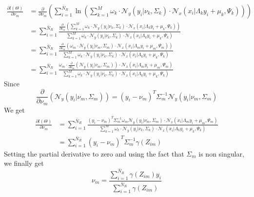 \begin{align}
\frac{\partial l(\Theta)   }{\partial  \nu_m } &=\frac{\partial }{\partial \nu_m}\left( \sum\limits_{i = 1}^{\bar{N}_R}\ln\left(\sum\limits_{k = 1}^{M}\omega_k\cdot
\mathcal{N}_y\left(y_i\vert\nu_k,\Sigma_k\right)\cdot\mathcal{N}_x\left(x_i\vert\Lambda_ky_i + \mu_k,\Psi_k\right)\right)\right)\\
&= \sum\limits_{i = 1}^{\bar{N}_R}
\frac{\frac{\partial }{\partial \nu_m}\left(\sum\limits_{k = 1}^{M}\omega_k\cdot
\mathcal{N}_y\left(y_i\vert\nu_k,\Sigma_k\right)\cdot\mathcal{N}_x\left(x_i\vert\Lambda_ky_i + \mu_k,\Psi_k\right)\right)}{\sum\limits_{k = 1}^{M}\omega_k\cdot
\mathcal{N}_y\left(y_i\vert\nu_k,\Sigma_k\right)\cdot\mathcal{N}_x\left(x_i\vert\Lambda_ky_i + \mu_k,\Psi_k\right) }\\
&= \sum\limits_{i = 1}^{\bar{N}_R}
\frac{\frac{\partial }{\partial \nu_m}\left(\omega_m\cdot
\mathcal{N}_y\left(y_i\vert\nu_m,\Sigma_m\right)\cdot\mathcal{N}_x\left(x_i\vert\Lambda_my_i + \mu_m,\Psi_m\right)\right)}{\sum\limits_{k = 1}^{M}\omega_k\cdot
\mathcal{N}_y\left(y_i\vert\nu_k,\Sigma_k\right)\cdot\mathcal{N}_x\left(x_i\vert\Lambda_ky_i + \mu_k,\Psi_k\right) }\\
&= \sum\limits_{i = 1}^{\bar{N}_R}
\frac{\omega_m\cdot
\frac{\partial }{\partial \nu_m}\left(\mathcal{N}_y\left(y_i\vert\nu_m,\Sigma_m\right)\right)\cdot\mathcal{N}_x\left(x_i\vert\Lambda_my_i + \mu_m,\Psi_m\right)}{\sum\limits_{k = 1}^{M}\omega_k\cdot
\mathcal{N}_y\left(y_i\vert\nu_k,\Sigma_k\right)\cdot\mathcal{N}_x\left(x_i\vert\Lambda_ky_i + \mu_k,\Psi_k\right) }
\end{align}
Since
\begin{equation}
\frac{\partial }{\partial \nu_m}\left(\mathcal{N}_y\left(y_i\vert\nu_m,\Sigma_m\right)\right) = \left(y_i - \nu_m\right)^T\Sigma_m^{-1}\mathcal{N}_y\left(y_i\vert\nu_m,\Sigma_m\right)
\end{equation}
We get
\begin{align}
\frac{\partial l(\Theta)   }{\partial  \nu_m } & = \sum\limits_{i = 1}^{\bar{N}_R}
\frac{\left(y_i - \nu_m\right)^T\Sigma_m^{-1}
\omega_m \mathcal{N}_y\left(y_i\vert\nu_m,\Sigma_m\right)\cdot\mathcal{N}_x\left(x_i\vert\Lambda_my_i + \mu_m,\Psi_m\right)}{\sum\limits_{k = 1}^{M}\omega_k\cdot
\mathcal{N}_y\left(y_i\vert\nu_k,\Sigma_k\right)\cdot\mathcal{N}_x\left(x_i\vert\Lambda_ky_i + \mu_k,\Psi_k\right) }\\
&= \sum\limits_{i = 1}^{\bar{N}_R}
\left(y_i - \nu_m\right)^T\Sigma_m^{-1}\gamma\left(Z_{im}\right)
\end{align}
Setting the partial derivative to zero and using the fact that $\Sigma_m$ is non singular, we finally get
\begin{equation}
\boxed{
\nu_m = \frac{ \sum\limits_{i = 1}^{\bar{N}_R}\gamma\left(Z_{im}\right)y_i}{ \sum\limits_{i = 1}^{\bar{N}_R}\gamma\left(Z_{im}\right)}}
\end{equation}

